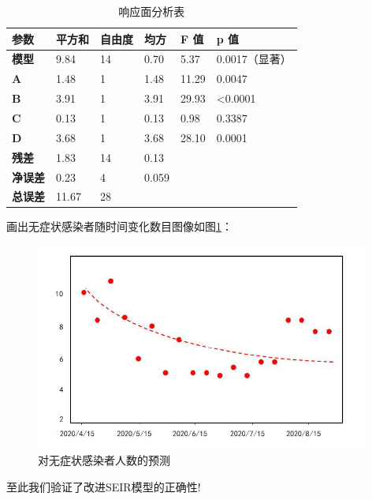 \documentclass[a4paper, 11pt,twoside=true,UTF8]{scrartcl}
\begin{document}
\begin{table}[h]
	\centering
	\caption{响应面分析表} \label{P3T9}
	\begin{tabular}{llllll}
		\hline
		\textbf{参数}  & \textbf{平方和} & \textbf{自由度} & \textbf{均方} & \textbf{F 值} & \textbf{p 值}     \\ \hline
		\textbf{模型}  & 9.84         & 14           & 0.70        & 5.37         & 0.0017（显著）       \\
		\textbf{A}   & 1.48         & 1            & 1.48        & 11.29        & 0.0047           \\
		\textbf{B}   & 3.91         & 1            & 3.91        & 29.93        & \textless 0.0001 \\
		\textbf{C}   & 0.13         & 1            & 0.13        & 0.98         & 0.3387           \\
		\textbf{D}   & 3.68         & 1            & 3.68        & 28.10        & 0.0001           \\
		\textbf{残差}  & 1.83         & 14           & 0.13        &              &                  \\
		\textbf{净误差} & 0.23         & 4            & 0.059       &              &                  \\
		\textbf{总误差} & 11.67        & 28           &             &              &                  \\ \hline
	\end{tabular}
\end{table}

画出无症状感染者随时间变化数目图像如图\ref{res}：

\begin{figure}[H]
	\small
	\centering
	\includegraphics[width=11cm]{res}
	\caption{对无症状感染者人数的预测} \label{res}
\end{figure}

至此我们验证了改进SEIR模型的正确性!
\end{document}
